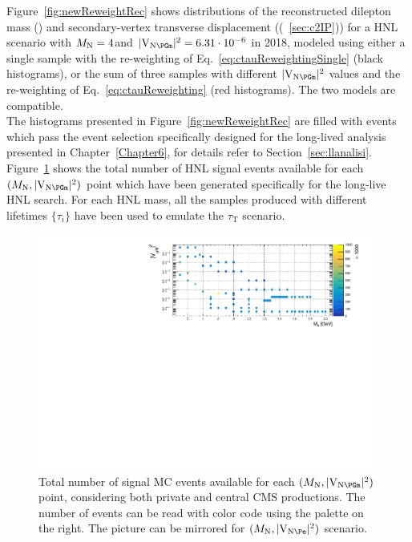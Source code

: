 Figure~\ref{fig:newReweightRec} shows distributions of the
reconstructed dilepton mass (\mtwol) and secondary-vertex transverse
displacement (\Deltwod (~\ref{sec:c2IP})) for a HNL scenario with
$M_{\mathrm{N}}=4$\GeV and $\mixparm = 6.31\cdot 10^{-6}$ in 2018,
modeled using either a single sample with the re-weighting of
Eq.~\ref{eq:ctauReweightingSingle} (black histograms), or the sum of
three samples with different $\mixparm$ values and the re-weighting of
Eq.~\ref{eq:ctauReweighting} (red histograms). The two models are compatible.\\
The histograms
presented in Figure~\ref{fig:newReweightRec} are filled with events
which pass the event selection specifically designed for the
long-lived analysis presented in Chapter~\ref{Chapter6}, for details
refer to Section~\ref{sec:llanalisi}. \\

Figure~\ref{fig:hnlSamples} shows the total number of HNL signal
events available for each $(\mhnl,\mixparm)$ point which have been
generated specifically for the long-live HNL search. For each HNL
mass, all the samples produced with different lifetimes
$\{\tau_i\}$ have been used to emulate the $\tau_{\mathrm T}$ scenario.


\begin{figure}
  \centering
  \includegraphics[clip,trim=0.7cm 0cm 0cm 0cm ,width=0.98\textwidth]{Figures/c4/mu.pdf}
  \caption{Total number of signal MC events available for each
    $(\mhnl,\mixparm)$ point, considering both private and central CMS
    productions. The number of events can be read with color code
    using the palette on the right. The picture can be mirrored for $(\mhnl,\mixpare)$ scenario.}
  \label{fig:hnlSamples}
\end{figure}



